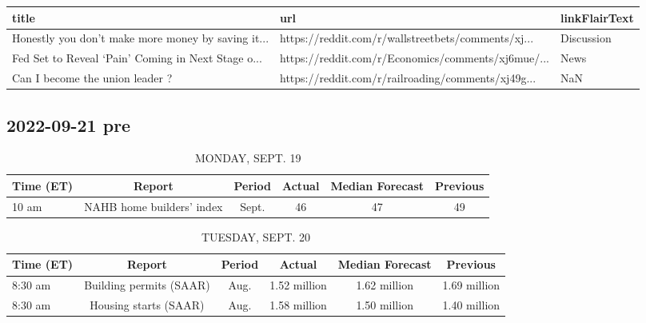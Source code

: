 \documentclass{book}
\begin{document}
  
  \begin{table}[htbp]%
  \centering%
  \begin{adjustbox}{width=1\textwidth}%
  \begin{tabular}{lll}
  \toprule
                                               title &                                                url & linkFlairText \\
  \midrule
  Honestly you don’t make more money by saving it... & https://reddit.com/r/wallstreetbets/comments/xj... &    Discussion \\
  Fed Set to Reveal ‘Pain’ Coming in Next Stage o... & https://reddit.com/r/Economics/comments/xj6mue/... &          News \\
                     Can I become the union leader ? & https://reddit.com/r/railroading/comments/xj49g... &           NaN \\
  \bottomrule
  \end{tabular}
  \end{adjustbox}%
  \end{table}
  
  
  

  
  \subsection{ 2022-09-21 pre }
  \normalsize%
  
  
  \begin{table}[htbp]%
  \caption{MONDAY, SEPT. 19}%
  \centering%
  \begin{adjustbox}{width=1\textwidth}%
  \begin{tabular}{lccccc}
  \toprule
  Time (ET) &                    Report & Period & Actual & Median Forecast & Previous \\
  \midrule
      10 am & NAHB home builders' index &  Sept. &     46 &              47 &       49 \\
  \bottomrule
  \end{tabular}
  \end{adjustbox}%
  \end{table}
  
  
  
  \begin{table}[htbp]%
  \caption{TUESDAY, SEPT. 20}%
  \centering%
  \begin{adjustbox}{width=1\textwidth}%
  \begin{tabular}{lccccc}
  \toprule
  Time (ET) &                  Report & Period &       Actual & Median Forecast &     Previous \\
  \midrule
    8:30 am & Building permits (SAAR) &   Aug. & 1.52 million &    1.62 million & 1.69 million \\
    8:30 am &   Housing starts (SAAR) &   Aug. & 1.58 million &    1.50 million & 1.40 million \\
  \bottomrule
  \end{tabular}
  \end{adjustbox}%
  \end{table}
  
\end{document}
